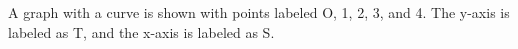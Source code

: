 A graph with a curve is shown with points labeled O, 1, 2, 3, and 4. The y-axis is labeled as T, and the x-axis is labeled as S.